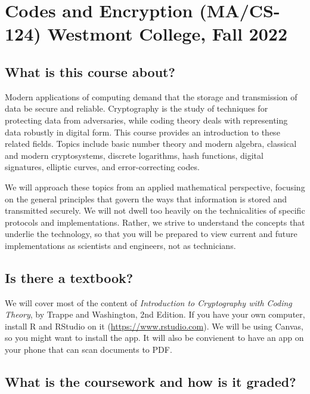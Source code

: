 \documentclass[
  twoside]{article}
\author{}
\date{\vspace{-2.5em}}
\begin{document}
\hypertarget{codes-and-encryption-macs-124-westmont-college-fall-2022}{%
\section{Codes and Encryption (MA/CS-124) Westmont College, Fall
2022}\label{codes-and-encryption-macs-124-westmont-college-fall-2022}}

\hypertarget{what-is-this-course-about}{%
\subsection{What is this course
about?}\label{what-is-this-course-about}}

Modern applications of computing demand that the storage and
transmission of data be secure and reliable. Cryptography is the study
of techniques for protecting data from adversaries, while coding theory
deals with representing data robustly in digital form. This course
provides an introduction to these related fields. Topics include basic
number theory and modern algebra, classical and modern cryptosystems,
discrete logarithms, hash functions, digital signatures, elliptic
curves, and error-correcting codes.

We will approach these topics from an applied mathematical perspective,
focusing on the general principles that govern the ways that information
is stored and transmitted securely. We will not dwell too heavily on the
technicalities of specific protocols and implementations. Rather, we
strive to understand the concepts that underlie the technology, so that
you will be prepared to view current and future implementations as
scientists and engineers, not as technicians.

\hypertarget{is-there-a-textbook}{%
\subsection{Is there a textbook?}\label{is-there-a-textbook}}

We will cover most of the content of \emph{Introduction to Cryptography
with Coding Theory}, by Trappe and Washington, 2nd Edition. If you have
your own computer, install R and RStudio on it
(\url{https://www.rstudio.com}). We will be using Canvas, so you might
want to install the app. It will also be convienent to have an app on
your phone that can scan documents to PDF.

\hypertarget{what-is-the-coursework-and-how-is-it-graded}{%
\subsection{What is the coursework and how is it
graded?}\label{what-is-the-coursework-and-how-is-it-graded}}
\end{document}

